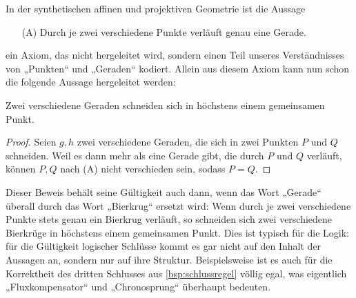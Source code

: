 \begin{bsp}[*]
    In der synthetischen affinen und projektiven Geometrie ist die Aussage
    \begin{itemize}
        \item[(A)] Durch je zwei verschiedene Punkte verläuft genau eine Gerade.
    \end{itemize}
    ein Axiom, das nicht hergeleitet wird, sondern einen Teil unseres Verständnisses von „Punkten“ und „Geraden“ kodiert. Allein aus diesem Axiom kann nun schon die folgende Aussage hergeleitet werden:
    \begin{satz}[*]
        Zwei verschiedene Geraden schneiden sich in höchstens einem gemeinsamen Punkt.
    \end{satz}
    \begin{proof}
        Seien $g,h$ zwei verschiedene Geraden, die sich in zwei Punkten $P$ und $Q$ schneiden. Weil es dann mehr als eine Gerade gibt, die durch $P$ und $Q$ verläuft, können $P,Q$ nach (A) nicht verschieden sein, sodass $P=Q$.
    \end{proof}
\end{bsp}


\begin{bem}
    Dieser Beweis behält seine Gültigkeit auch dann, wenn das Wort „Gerade“ überall durch das Wort „Bierkrug“ ersetzt wird: Wenn durch je zwei verschiedene Punkte stets genau ein Bierkrug verläuft, so schneiden sich zwei verschiedene Bierkrüge in höchstens einem gemeinsamen Punkt. Dies ist typisch für die Logik: für die Gültigkeit logischer Schlüsse kommt es gar nicht auf den Inhalt der Aussagen an, sondern nur auf ihre Struktur. Beispielsweise ist es auch für die Korrektheit des dritten Schlusses aus \cref{bsp:schlussregel} völlig egal, was eigentlich „Fluxkompensator“ und „Chronosprung“ überhaupt bedeuten.
\end{bem}


